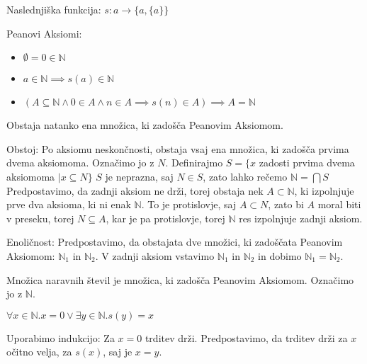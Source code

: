 \begin{definicija}
    Naslednjiška funkcija: $s: a \longrightarrow \{a, \{a\}\}$

    Peanovi Aksiomi:
    \begin{itemize}
        \item $\emptyset = 0 \in \mathbb{N}$
        \item $a \in \mathbb{N} \implies s(a) \in \mathbb{N}$
        \item $(A \subseteq \mathbb{N} \wedge 0 \in A \wedge n \in A \implies s(n) \in A) \implies A = \mathbb{N}$
    \end{itemize}
\end{definicija}

\begin{trditev}
    Obstaja natanko ena množica, ki zadošča Peanovim Aksiomom.
\end{trditev}
\begin{dokaz}
    Obstoj:
    Po aksiomu neskončnosti, obstaja vsaj ena množica, ki zadošča prvima dvema aksiomoma.
    Označimo jo z $N$.
    Definirajmo $S = \{x$ zadosti prvima dvema aksiomoma $| x \subseteq N\}$
    $S$ je neprazna, saj $N \in S$, zato lahko rečemo $\mathbb{N} = \bigcap S$
    Predpostavimo, da zadnji aksiom ne drži, torej obstaja nek $A \subset \mathbb{N}$, ki izpolnjuje prve dva aksioma, ki ni enak $\mathbb{N}$.
    To je protislovje, saj $A \subset N$, zato bi $A$ moral biti v preseku, torej $N \subseteq A$, kar je pa protislovje, torej $\mathbb{N}$ res izpolnjuje zadnji aksiom.

    Enoličnost:
Predpostavimo, da obstajata dve množici, ki zadoščata Peanovim Aksiomom: $\mathbb{N}_1$ in $\mathbb{N}_2$.
V zadnji aksiom vstavimo $\mathbb{N}_1$ in $\mathbb{N}_2$ in dobimo $\mathbb{N}_1 = \mathbb{N}_2$.
\end{dokaz}

\begin{definicija}
    Množica naravnih števil je množica, ki zadošča Peanovim Aksiomom.
    Označimo jo z $\mathbb{N}$.
\end{definicija}

\begin{trditev}
    $\forall x \in \mathbb{N}. x = 0 \vee \exists y \in \mathbb{N}. s(y) = x$
\end{trditev}
\begin{dokaz}
    Uporabimo indukcijo: Za $x = 0$ trditev drži.
    Predpostavimo, da trditev drži za $x$ očitno velja, za $s(x)$, saj je $x = y$.
\end{dokaz}


